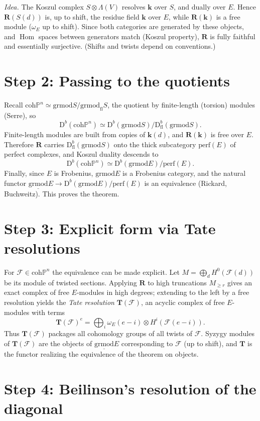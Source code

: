 \documentclass[11pt]{article}
\theoremstyle{remark}
\newcommand{\PP}{\mathbb{P}}
\newcommand{\Dcal}{\mathrm{D}}
\newcommand{\coh}{\mathrm{coh}}
\newcommand{\grmod}{\mathrm{grmod}}
\newcommand{\stgrmod}{\underline{\mathrm{grmod}}}
\newcommand{\perf}{\mathrm{perf}}
\newcommand{\Hom}{\operatorname{Hom}}
\renewcommand{\k}{\mathbf{k}}
\begin{document}
\emph{Idea.} The Koszul complex $S\otimes\Lambda(V)$ resolves $\k$ over $S$, and dually over $E$. Hence $\mathbf{R}(S(d))$ is, up to shift, the residue field $\k$ over $E$, while $\mathbf{R}(\k)$ is a free module ($\omega_E$ up to shift). Since both categories are generated by these objects, and $\Hom$ spaces between generators match (Koszul property), $\mathbf{R}$ is fully faithful and essentially surjective. (Shifts and twists depend on conventions.)

\section{Step 2: Passing to the quotients}

Recall $\coh\PP^n\simeq \grmod S/\grmod_{\mathrm{fl}}S$, the quotient by finite-length (torsion) modules (Serre), so
\[
\Dcal^b(\coh\PP^n)\simeq \Dcal^b(\grmod S)/\Dcal^b_{\mathrm{fl}}(\grmod S).
\]
Finite-length modules are built from copies of $\k(d)$, and $\mathbf{R}(\k)$ is free over $E$. Therefore $\mathbf{R}$ carries $\Dcal^b_{\mathrm{fl}}(\grmod S)$ onto the thick subcategory $\perf(E)$ of perfect complexes, and Koszul duality descends to
\[
\Dcal^b(\coh\PP^n)\simeq \Dcal^b(\grmod E)/\perf(E).
\]
Finally, since $E$ is Frobenius, $\grmod E$ is a Frobenius category, and the natural functor $\stgrmod E\to \Dcal^b(\grmod E)/\perf(E)$ is an equivalence (Rickard, Buchweitz). This proves the theorem.

\section{Step 3: Explicit form via Tate resolutions}

For $\mathcal F\in\coh\PP^n$ the equivalence can be made explicit. Let $M=\bigoplus_d H^0(\mathcal F(d))$ be its module of twisted sections. Applying $\mathbf{R}$ to high truncations $M_{\ge r}$ gives an exact complex of free $E$-modules in high degrees; extending to the left by a free resolution yields the \emph{Tate resolution} $\mathbf T(\mathcal F)$, an acyclic complex of free $E$-modules with terms
\[
\mathbf T(\mathcal F)^e=\bigoplus_i \omega_E(e-i)\otimes H^i(\mathcal F(e-i)).
\]
Thus $\mathbf T(\mathcal F)$ packages all cohomology groups of all twists of $\mathcal F$. Syzygy modules of $\mathbf T(\mathcal F)$ are the objects of $\stgrmod E$ corresponding to $\mathcal F$ (up to shift), and $\mathbf T$ is the functor realizing the equivalence of the theorem on objects.

\section{Step 4: Beilinson's resolution of the diagonal}
\end{document}
